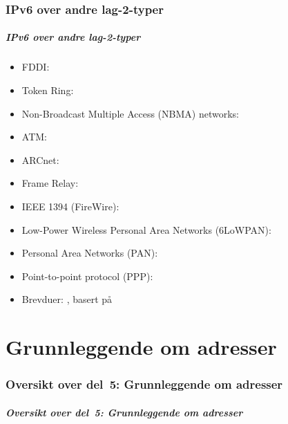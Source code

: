 \section{IPv6 over andre lag-2-typer}
\begin{frame}
  \frametitle{IPv6 over andre lag-2-typer}
  \begin{itemize}
  \item FDDI: 
  \item Token Ring: 
  \item Non-Broadcast Multiple Access (NBMA) networks: 
  \item ATM: 
  \item ARCnet: 
  \item Frame Relay: 
  \item IEEE 1394 (FireWire): 
  \item Low-Power Wireless Personal Area Networks (6LoWPAN): 
  \item Personal Area Networks (PAN): 
  \item Point-to-point protocol (PPP): 
  \item Brevduer: , basert på 
  \end{itemize}
\end{frame}

\part{Grunnleggende om adresser}

\begin{frame}
  \partpage
\end{frame}

\section*{Oversikt over del~5: Grunnleggende om adresser}
\begin{frame}
  \frametitle{Oversikt over del~5: Grunnleggende om adresser}
    \tableofcontents
\end{frame}

